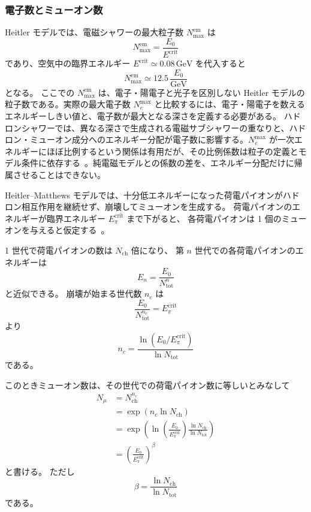 \documentclass[book,paper=a4,fontsize=11pt]{jlreq}
\begin{document}
\subsubsection{電子数とミューオン数}
Heitler モデルでは、電磁シャワーの最大粒子数 \(N_{\max}^{\mathrm{em}}\) は
\[
  N_{\max}^{\mathrm{em}}=\frac{E_0}{E^\mathrm{crit}}
\]
であり、空気中の臨界エネルギー \(E^\mathrm{crit}\simeq 0.08\,\mathrm{GeV}\) を代入すると
\[
  N_{\max}^{\mathrm{em}}\simeq 12.5\,\frac{E_0}{\mathrm{GeV}}
\]
となる。
ここでの \(N_{\max}^{\mathrm{em}}\) は、電子・陽電子と光子を区別しない Heitler モデルの粒子数である。実際の最大電子数 \(N_e^{\max}\) と比較するには、電子・陽電子を数えるエネルギーしきい値と、電子数が最大となる深さを定義する必要がある。
ハドロンシャワーでは、異なる深さで生成される電磁サブシャワーの重なりと、ハドロン・ミューオン成分へのエネルギー分配が電子数に影響する。\(N_e^{\max}\) が一次エネルギーにほぼ比例するという関係は有用だが、その比例係数は粒子の定義とモデル条件に依存する~\cite{Matthews2005,Montanus2013}。純電磁モデルとの係数の差を、エネルギー分配だけに帰属させることはできない。

Heitler--Matthews モデルでは、十分低エネルギーになった荷電パイオンがハドロン相互作用を継続せず、崩壊してミューオンを生成する。
荷電パイオンのエネルギーが臨界エネルギー \(E_\pi^{\mathrm{crit}}\) まで下がると、
各荷電パイオンは 1 個のミューオンを与えると仮定する~\cite{Matthews2005}。

1 世代で荷電パイオンの数は \(N_{\mathrm{ch}}\) 倍になり、
第 \(n\) 世代での各荷電パイオンのエネルギーは
\[
  E_n = \frac{E_0}{N_{\mathrm{tot}}^n}
\]
と近似できる。
崩壊が始まる世代数 \(n_c\) は
\begin{equation}
  \frac{E_0}{N_{\mathrm{tot}}^{n_c}}=E_\pi^{\mathrm{crit}}
\end{equation}
より
\begin{equation}
  n_c = \frac{\ln(E_0/E_\pi^{\mathrm{crit}})}{\ln N_{\mathrm{tot}}}
\end{equation}
である。

このときミューオン数は、その世代での荷電パイオン数に等しいとみなして
\begin{align}
  N_\mu
  &= N_{\mathrm{ch}}^{n_c} \\
  &= \exp\!\left(n_c\ln N_{\mathrm{ch}}\right) \\
  &= \exp\!\left(\ln\!\left(\frac{E_0}{E_\pi^{\mathrm{crit}}}\right)
     \frac{\ln N_{\mathrm{ch}}}{\ln N_{\mathrm{tot}}}\right) \\
  &= \left(\frac{E_0}{E_\pi^{\mathrm{crit}}}\right)^{\beta}
\end{align}
と書ける。
ただし
\begin{equation}
  \beta = \frac{\ln N_{\mathrm{ch}}}{\ln N_{\mathrm{tot}}}
\end{equation}
である。
\end{document}
